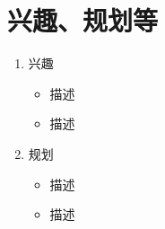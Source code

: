 \section*{兴趣、规划等}

\begin{enumerate}
    \item 兴趣
    \begin{itemize}
        \item 描述
        \item 描述
    \end{itemize}
    \item 规划
    \begin{itemize}
        \item 描述
        \item 描述
    \end{itemize}
\end{enumerate}